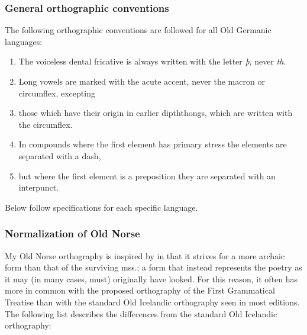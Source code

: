     \subsubsection{General orthographic conventions}

    The following orthographic conventions are followed for all Old Germanic languages:

    \begin{enumerate}
    \item The voiceless dental fricative is always written with the letter \emph{þ}, never \emph{th}.
    \item Long vowels are marked with the acute accent, never the macron or circumflex, excepting
    \item those which have their origin in earlier dipththongs, which are written with the circumflex.
    \item In compounds where the first element has primary stress the elements are separated with a dash,
    \item but where the first element is a preposition they are separated with an interpunct.
    \end{enumerate}

    Below follow specifications for each specific language.

    \subsubsection{Normalization of Old Norse}

    My Old Norse orthography is inspired by \textcite{FinnurEdda} in that it strives for a more archaic form than that of the surviving mss.; a form that instead represents the poetry as it may (in many cases, must) originally have looked. For this reason, it often has more in common with the proposed orthography of the First Grammatical Treatise than with the standard Old Icelandic orthography seen in most editions. The following list describes the differences from the standard Old Icelandic orthography:

